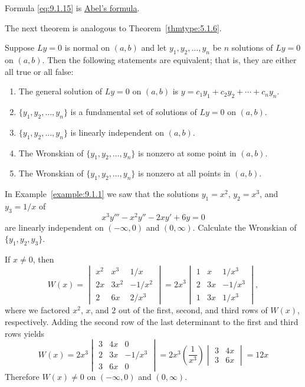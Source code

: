 \documentclass{ximera}
\begin{document}
Formula \eqref{eq:9.1.15} is
 \href{http://www-history.mcs.st-and.ac.uk/Mathematicians/Abel.html}{Abel's formula}.

The next theorem is analogous to
Theorem~\ref{thmtype:5.1.6}.

\begin{theorem}\label{thmtype:9.1.4}
Suppose $Ly=0$ is normal on $(a,b)$ and let $y_1, y_2, \dots, y_n$
be $n$ solutions of $Ly=0$ on $(a,b)$. Then the following statements
are equivalent;  that is, they are either all true or all false:
\begin{enumerate}
\item\label{item:9.1.4a} %
The general solution of $Ly=0$ on $(a,b)$ is
$y=c_1y_1+c_2y_2+\cdots+c_ny_n$.
\item\label{item:9.1.4b} %
 $\{y_1,y_2,\dots,y_n\}$ is a fundamental set of solutions of
$Ly=0$ on $(a,b)$.
\item\label{item:9.1.4c} %
$\{y_1,y_2,\dots,y_n\}$ is linearly independent on $(a,b)$.
\item\label{item:9.1.4d} %
The Wronskian of $\{y_1,y_2,\dots,y_n\}$ is nonzero at some point in
$(a,b)$.
\item\label{item:9.1.4e} %
The Wronskian of $\{y_1,y_2,\dots,y_n\}$ is nonzero at all points in
$(a,b)$.
\end{enumerate}
\end{theorem}

\begin{example}\label{example:9.1.3}
In Example~\ref{example:9.1.1} we saw that the solutions $y_1=x^2$,
$y_2=x^3$, and $y_3=1/x$ of
$$
x^3y'''-x^2y''-2xy'+6y=0
$$
are linearly independent on $(-\infty,0)$ and $(0,\infty)$. Calculate
the Wronskian  of $\{y_1,y_2,y_3\}$.

\begin{explanation}
If $x\neq 0$,  then
$$
W(x)=\begin{vmatrix}
x^2&x^3&1/x\\
2x&3x^2&-1/x^2\\
2&6x&2/x^3\end{vmatrix}
=2x^3\begin{vmatrix}
1&x&1/x^3\\2&3x&-1/x^3
\\1&3x&1/x^3\end{vmatrix},
$$
where we factored $x^2$, $x$, and $2$ out of the first, second, and
third  rows of
$W(x)$, respectively. Adding the second row of the last determinant
to the first and third rows yields
$$
W(x)=2x^3\begin{vmatrix}
3&4x&0\\
2&3x&-1/x^3\\
3&6x&0\end{vmatrix}
=2x^3\left(\frac{1}{x^3}\right)\begin{vmatrix}3&4x\\3&6x
\end{vmatrix}=12x
$$
Therefore $W(x)\neq 0$ on $(-\infty,0)$ and $(0,\infty)$.
\end{explanation}
\end{example}
\end{document}
